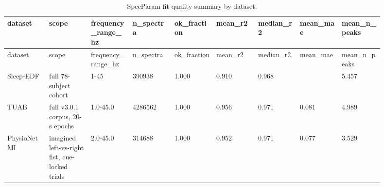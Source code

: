 \begin{longtable}{p{0.10\linewidth}p{0.10\linewidth}p{0.10\linewidth}p{0.10\linewidth}p{0.10\linewidth}p{0.10\linewidth}p{0.10\linewidth}p{0.10\linewidth}p{0.10\linewidth}}
\caption{SpecParam fit quality summary by dataset.}\label{tab:supp_specparam_fit_quality}\\
\toprule
dataset & scope & frequency\_range\_hz & n\_spectra & ok\_fraction & mean\_r2 & median\_r2 & mean\_mae & mean\_n\_peaks\\
\midrule
\endfirsthead
\toprule
dataset & scope & frequency\_range\_hz & n\_spectra & ok\_fraction & mean\_r2 & median\_r2 & mean\_mae & mean\_n\_peaks\\
\midrule
\endhead
Sleep-EDF & full 78-subject cohort & 1-45 & 390938 & 1.000 & 0.910 & 0.968 &  & 5.457\\
TUAB & full v3.0.1 corpus, 20-s epochs & 1.0-45.0 & 4286562 & 1.000 & 0.956 & 0.971 & 0.081 & 4.989\\
PhysioNet MI & imagined left-vs-right fist, cue-locked trials & 2.0-45.0 & 314688 & 1.000 & 0.952 & 0.971 & 0.077 & 3.529\\
\bottomrule
\end{longtable}
